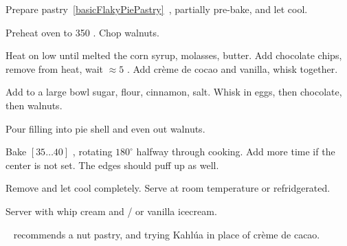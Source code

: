 \begin{preparation}
\item Prepare pastry~\ref{basicFlakyPiePastry}~, partially pre-bake, and let cool.

\item Preheat oven to 350 \Fahrenheit.
	Chop walnuts.

\item Heat on low until melted the corn syrup, molasses, butter.
	Add chocolate chips, remove from heat, wait $\approx 5$ \minute.
	Add cr\`{e}me de cocao and vanilla, whisk together.

\item Add to a large bowl sugar, flour, cinnamon, salt.
	Whisk in eggs, then chocolate, then walnuts.

\item Pour filling into pie shell and even out walnuts.

\item Bake $[35 \dots 40]$ \minute, rotating $180^\circ$ halfway through cooking.
	Add more time if the center is not set.
	The edges should puff up as well.

\item Remove and let cool completely.
	Serve at room temperature or refridgerated.
\end{preparation}


\begin{variation}
\item Server with whip cream and / or vanilla icecream.

\item \citeauthor{pie2004}~\cite{pie2004} recommends a nut pastry, and trying Kahl\'{u}a in place of cr\`{e}me de cacao.
\end{variation}


\recipeend%
